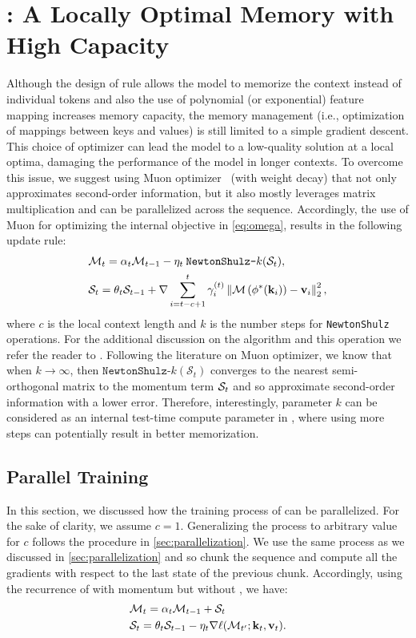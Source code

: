 \section{\model: A Locally Optimal Memory with High Capacity} \label{sec:model}
Although the design of \learningrule{} rule allows the model to memorize the context instead of individual tokens and also the use of polynomial (or exponential) feature mapping increases memory capacity, the memory management (i.e., optimization of mappings between keys and values) is still limited to a simple gradient descent. This choice of optimizer can lead the model to a low-quality solution at a local optima, damaging the performance of the model in longer contexts. To overcome this issue, we suggest using Muon optimizer~\citep{jordan2024muon} (with weight decay) that not only approximates second-order information, but it also mostly leverages matrix multiplication and can be parallelized across the sequence. Accordingly, the use of Muon for optimizing the internal objective in \autoref{eq:omega}, results in the following update rule:
\begin{align}
     &\mathcal{M}_t = \alpha_t \mathcal{M}_{t-1} - \eta_t \: \texttt{NewtonShulz-$k$}(\mathcal{S}_t),\\
     &\mathcal{S}_t = \theta_t \mathcal{S}_{t-1} + \nabla \sum_{i = t - c + 1}^{t} \gamma^{(t)}_i \left\| \mathcal{M}\left(\phi^{*}(\mathbf{k}_i)\right) - \mathbf{v}_i \right\|^2_2,
\end{align}
where $c$ is the local context length and $k$ is the number steps for \texttt{NewtonShulz} operations. For the additional discussion on the algorithm and this operation we refer the reader to \citet{jordan2024muon}. Following the literature on Muon optimizer, we know that when $k \rightarrow \infty$, then  $\texttt{NewtonShulz-$k$}(\mathcal{S}_t)$ converges to the nearest semi-orthogonal matrix to the momentum term $\mathcal{S}_t$ and so approximate second-order information with a lower error. Therefore, interestingly, parameter $k$ can be considered as an internal test-time compute parameter in \model, where using more steps can potentially result in better memorization. 


\subsection{Parallel Training}
In this section, we discussed how the training process of \model{} can be parallelized. For the sake of clarity, we assume $c=1$. Generalizing the process to arbitrary value for $c$ follows the procedure in \autoref{sec:parallelization}. We use the same process as we discussed in \autoref{sec:parallelization} and so chunk the sequence and compute all the gradients with respect to the last state of the previous chunk. Accordingly, using the recurrence of \model{} with momentum but without , we have:
\begin{align}
    &\mathcal{M}_t = \alpha_t \mathcal{M}_{t-1} + \mathcal{S}_t \\
    &\mathcal{S}_t = \theta_t \mathcal{S}_{t-1} - \eta_t \nabla \ell(\mathcal{M}_{t'}; \mathbf{k}_t, \mathbf{v}_t).
\end{align}

